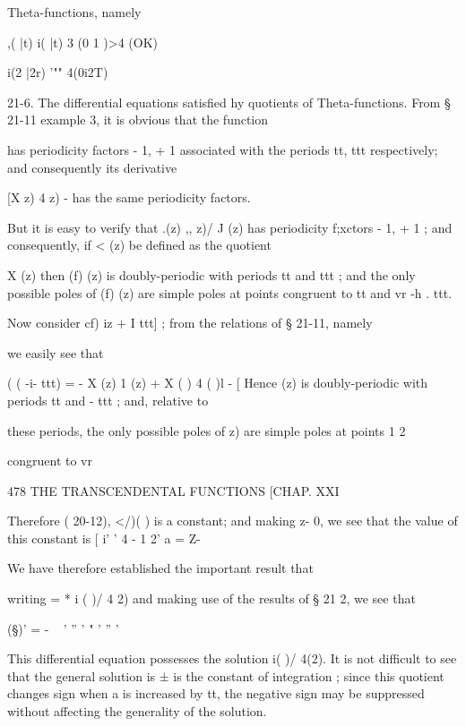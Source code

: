 Theta-functions, namely 

 ,( |t) i( |t)  3 (0 1 )>4 (OK) 

 i(2 |2r) '"" 4(0i2T) 

21-6. The differential equations satisfied hy quotients of Theta-functions. 
From § 21-11 example 3, it is obvious that the function 

has periodicity factors - 1, + 1 associated with the periods tt, ttt respectively; 
and consequently its derivative 

[X  z)  4  z) - %
has the same periodicity factors. 

But it is easy to verify that  .(z) ,, z)/ J  (z) has periodicity f;xctors - 1, 
+ 1 ; and consequently, if <  (z) be defined as the quotient 

 X (z) %
then (f) (z) is doubly-periodic with periods tt and ttt ; and the only possible 
poles of (f) (z) are simple poles at points congruent to   tt and   vr -h .  ttt. 



Now consider cf) iz + I ttt] ; from the relations of § 21-11, namely 


we easily see that 

(  (  -i-   ttt) =  - X (z)  1 (z) + X ( )  4 ( )l - [%
Hence   (z) is doubly-periodic with periods tt and -  ttt ; and, relative to 



these periods, the only possible poles of   z) are simple poles at points 
1 
2 



congruent to   vr 



478 THE TRANSCENDENTAL FUNCTIONS [CHAP. XXI 

Therefore ( 20-12), </)( ) is a constant; and making z- 0, we see that 
the value of this constant is [ i' ' 4  -  1 2' a  =  Z- 

We have therefore established the important result that 

writing   = * i ( )/ 4  2) and making use of the results of § 21 2, we see that 

(§)' =  -  ~  ' ''  ' "  '  '' ' 

This differential equation possesses the solution  i( )/ 4(2). It is not 
difficult to see that the general solution is ±%
is the constant of integration ; since this quotient changes sign when a is 
increased by tt, the negative sign may be suppressed without affecting the 
generality of the solution. 

